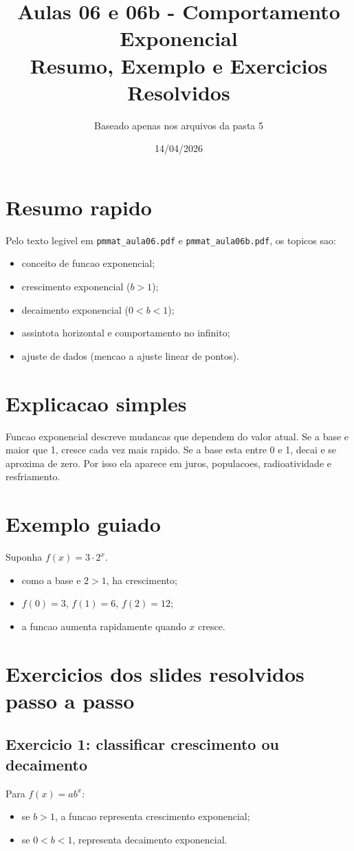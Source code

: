 \documentclass[12pt,a4paper]{article}
\title{Aulas 06 e 06b - Comportamento Exponencial\\Resumo, Exemplo e Exercicios Resolvidos}
\author{Baseado apenas nos arquivos da pasta 5}
\date{14/04/2026}
\begin{document}
\maketitle

\section{Resumo rapido}
Pelo texto legivel em \texttt{pmmat\_aula06.pdf} e \texttt{pmmat\_aula06b.pdf}, os topicos sao:
\begin{itemize}
  \item conceito de funcao exponencial;
  \item crescimento exponencial ($b>1$);
  \item decaimento exponencial ($0<b<1$);
  \item assintota horizontal e comportamento no infinito;
  \item ajuste de dados (mencao a ajuste linear de pontos).
\end{itemize}

\section{Explicacao simples}
Funcao exponencial descreve mudancas que dependem do valor atual.
Se a base e maior que 1, cresce cada vez mais rapido.
Se a base esta entre 0 e 1, decai e se aproxima de zero.
Por isso ela aparece em juros, populacoes, radioatividade e resfriamento.

\section{Exemplo guiado}
Suponha $f(x)=3\cdot 2^x$.
\begin{itemize}
  \item como a base e $2>1$, ha crescimento;
  \item $f(0)=3$, $f(1)=6$, $f(2)=12$;
  \item a funcao aumenta rapidamente quando $x$ cresce.
\end{itemize}

\section{Exercicios dos slides resolvidos passo a passo}
\subsection*{Exercicio 1: classificar crescimento ou decaimento}
Para $f(x)=ab^x$:
\begin{itemize}
  \item se $b>1$, a funcao representa crescimento exponencial;
  \item se $0<b<1$, representa decaimento exponencial.
\end{itemize}
\end{document}
